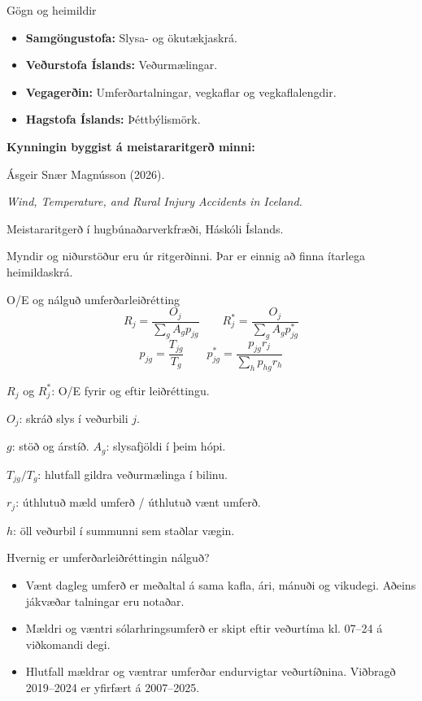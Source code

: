 \documentclass[aspectratio=169,12pt,t]{beamer}
\begin{document}
\appendix
\backuptrue
\setcounter{framenumber}{0}

\begin{frame}{Gögn og heimildir}
\relax
\begin{itemize}
\setlength{\itemsep}{1mm}
\item \textbf{Samgöngustofa:} Slysa- og ökutækjaskrá.
\item \textbf{Veðurstofa Íslands:} Veðurmælingar.
\item \textbf{Vegagerðin:} Umferðartalningar, vegkaflar og vegkaflalengdir.
\item \textbf{Hagstofa Íslands:} Þéttbýlismörk.
\end{itemize}
\vspace{2mm}
\textbf{Kynningin byggist á meistararitgerð minni:}\par
{\small Ásgeir Snær Magnússon (2026).\par
\emph{Wind, Temperature, and Rural Injury Accidents in Iceland.}\par
Meistararitgerð í hugbúnaðarverkfræði, Háskóli Íslands.\par
\vspace{2mm}
Myndir og niðurstöður eru úr ritgerðinni. Þar er einnig að finna ítarlega heimildaskrá.\par}
\end{frame}

\begin{frame}{O/E og nálguð umferðarleiðrétting}
\relax
\setlength{\parskip}{2pt}
\relax
\[
 R_j=\frac{O_j}{\sum_g A_g p_{jg}}
 \qquad
 R_j^{*}=\frac{O_j}{\sum_g A_g p^{*}_{jg}}
\]
\[
 p_{jg}=\frac{T_{jg}}{T_g}
 \qquad
 p^{*}_{jg}=\frac{p_{jg}r_j}{\sum_h p_{hg}r_h}
\]
\par\vspace{2mm}
{\small
$R_j$ og $R_j^*$: O/E fyrir og eftir leiðréttingu.\par
$O_j$: skráð slys í veðurbili $j$.\par
$g$: stöð og árstíð. $A_g$: slysafjöldi í þeim hópi.\par
$T_{jg}/T_g$: hlutfall gildra veðurmælinga í bilinu.\par
$r_j$: úthlutuð mæld umferð / úthlutuð vænt umferð.\par
$h$: öll veðurbil í summunni sem staðlar vægin.\par}
\end{frame}

\begin{frame}{Hvernig er umferðarleiðréttingin nálguð?}
\relax
\begin{itemize}\points
\item Vænt dagleg umferð er meðaltal á sama kafla, ári, mánuði og vikudegi. Aðeins jákvæðar talningar eru notaðar.
\item Mældri og væntri sólarhringsumferð er skipt eftir veðurtíma kl. 07--24 á viðkomandi degi.
\item Hlutfall mældrar og væntrar umferðar endurvigtar veðurtíðnina. Viðbragð 2019--2024 er yfirfært á 2007--2025.
\end{itemize}
\end{frame}
\end{document}

